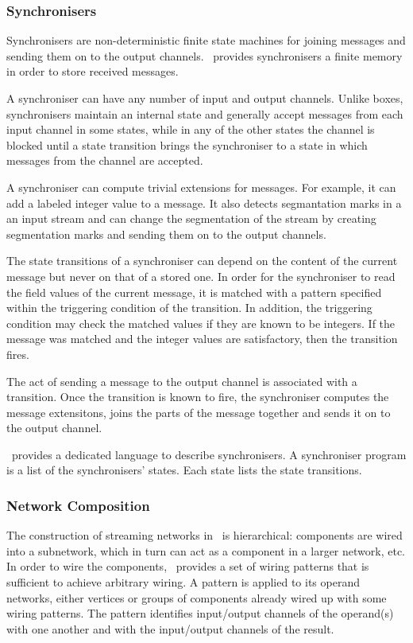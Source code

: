     \subsubsection{Synchronisers}
Synchronisers are non-deterministic finite state machines for joining messages and sending them on to the output channels. \ak\ provides synchronisers a finite memory in order to store received messages.

A synchroniser can have any number of input and output channels. Unlike boxes, synchronisers maintain an internal state and generally accept messages from each input channel in some states, while in any of the other states the channel is blocked until a state transition brings the synchroniser to a state in which messages from the channel are accepted.

A synchroniser can compute trivial extensions for messages. For example, it can add a labeled integer value to a message. It also detects segmantation marks in a an input stream and can change the segmentation of the stream by creating segmentation marks and sending them on to the output channels.

The state transitions of a synchroniser can depend on the content of the current message but never on that of a stored one. In order for the synchroniser to read the field values of the current message, it is matched with a pattern specified within the triggering condition of the transition. In addition, the triggering condition may check the matched values if they are known to be integers. If the message was matched and the integer values are satisfactory, then the transition fires.

The act of sending a message to the output channel is associated with a transition. Once the transition is known to fire, the synchroniser computes the message extensitons, joins the parts of the message together and sends it on to the output channel.

\ak\ provides a dedicated language to describe synchronisers. A synchroniser program is a list of the synchronisers' states. Each state lists the state transitions.


    \subsubsection{Network Composition}
The construction of streaming networks in \ak\ is hierarchical: components are wired into a subnetwork, which in turn can act as a component in a larger network, etc. In order to wire the components, \ak\ provides a set of wiring patterns that is sufficient to achieve arbitrary wiring. A pattern is applied to its operand networks, either vertices or groups of components already wired up with some wiring patterns. The pattern identifies input/output channels of the operand(s) with one another and with the input/output channels of the result.

